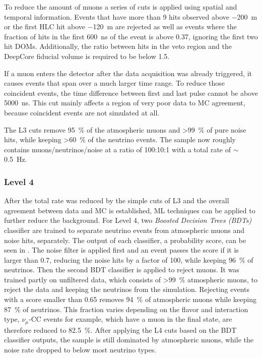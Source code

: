 To reduce the amount of muons a series of cuts is applied using spatial and temporal information. Events that have more than 9 hits observed above \SI{-200}{\meter} or the first HLC hit above \SI{-120}{\meter} are rejected as well as events where the fraction of hits in the first \SI{600}{\nano\second} of the event is above 0.37, ignoring the first two hit DOMs. Additionally, the ratio between hits in the veto region and the DeepCore fiducial volume is required to be below 1.5.

If a muon enters the detector after the data acquisition was already triggered, it causes events that span over a much larger time range. To reduce those coincident events, the time difference between first and last pulse cannot be above \SI{5000}{\nano\second}. This cut mainly affects a region of very poor data to MC agreement, because coincident events are not simulated at all.

The L3 cuts remove \SI{95}{\percent} of the atmospheric muons and >\SI{99}{\percent} of pure noise hits, while keeping >\SI{60}{\percent} of the neutrino events. The sample now roughly contains muons/neutrinos/noise at a ratio of 100:10:1 with a total rate of $\sim$\SI{0.5}{\hertz}.


\subsubsection{Level 4} 

After the total rate was reduced by the simple cuts of L3 and the overall agreement between data and MC is established, ML techniques can be applied to further reduce the background. For Level 4, two \textit{Boosted Decision Trees (BDTs)}  classifier are trained to separate neutrino events from atmospheric muons and noise hits, separately. The output of each classifier, a probability score, can be seen in . The noise filter is applied first and an event passes the score if it is larger than 0.7, reducing the noise hits by a factor of 100, while keeping \SI{96}{\percent} of neutrinos. Then the second BDT classifier is applied to reject muons. It was trained partly on unfiltered data, which consists of >\SI{99}{\percent} atmospheric muons, to reject the data and keeping the neutrinos from the simulation. Rejecting events with a score smaller than 0.65 removes \SI{94}{\percent} of atmospheric muons while keeping \SI{87}{\percent} of neutrinos. This fraction varies depending on the flavor and interaction type, $\nu_\mu$-CC events for example, which have a muon in the final state, are therefore reduced to \SI{82.5}{\percent}. After applying the L4 cuts based on the BDT classifier outputs, the sample is still dominated by atmospheric muons, while the noise rate dropped to below most neutrino types.

